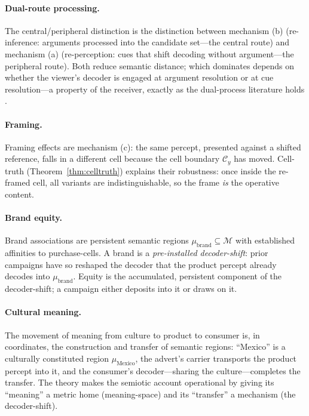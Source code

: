 \documentclass[twocolumn,11pt,a4paper]{article}
\theoremstyle{adv}
\theoremstyle{definition}
\theoremstyle{remark}
\newcommand{\Cell}{\mathcal{C}}        %
\newcommand{\Mean}{\mathcal{M}}        %
\begin{document}
\paragraph{Dual-route processing.}
The central/peripheral distinction \citep{petty1983} is the distinction
between mechanism (b) (re-inference: arguments processed into the candidate
set---the central route) and mechanism (a) (re-perception: cues that shift
decoding without argument---the peripheral route). Both reduce semantic
distance; which dominates depends on whether the viewer's decoder is
engaged at argument resolution or at cue resolution---a property of the
receiver, exactly as the dual-process literature holds \citep{kahneman2011}.

\paragraph{Framing.}
Framing effects \citep{tversky1981} are mechanism (c): the same percept,
presented against a shifted reference, falls in a different cell because
the cell boundary $\Cell_y$ has moved. Cell-truth
(Theorem~\ref{thm:celltruth}) explains their robustness: once inside the
re-framed cell, all variants are indistinguishable, so the frame
\emph{is} the operative content.

\paragraph{Brand equity.}
Brand associations \citep{aaker1991,keller1993} are persistent semantic
regions $\mu_{\text{brand}}\subseteq\Mean$ with established affinities to
purchase-cells. A brand is a \emph{pre-installed decoder-shift}: prior
campaigns have so reshaped the decoder that the product percept already
decodes into $\mu_{\text{brand}}$. Equity is the accumulated, persistent
component of the decoder-shift; a campaign either deposits into it or draws
on it.

\paragraph{Cultural meaning.}
The movement of meaning from culture to product to consumer
\citep{mccracken1988,mick1986,barthes1977} is, in coordinates, the
construction and transfer of semantic regions: ``Mexico'' is a culturally
constituted region $\mu_{\text{Mexico}}$, the advert's carrier transports
the product percept into it, and the consumer's decoder---sharing the
culture---completes the transfer. The theory makes the semiotic account
operational by giving its ``meaning'' a metric home (meaning-space) and its
``transfer'' a mechanism (the decoder-shift).
\end{document}

